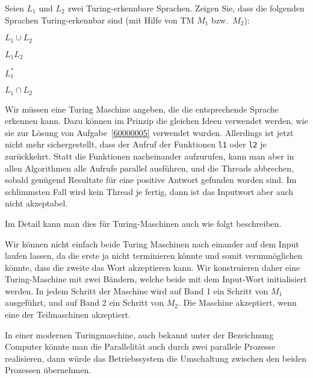 Seien $L_1$ und $L_2$ zwei Turing-erkennbare Sprachen. Zeigen Sie, dass
die folgenden Sprachen Turing-erkennbar sind (mit Hilfe von TM $M_1$
bzw.~$M_2$):
\begin{teilaufgaben}
\item $L_1\cup L_2$
\item $L_1L_2$
\item $L_1^*$
\item $L_1\cap L_2$
\end{teilaufgaben}

\begin{loesung}
Wir müssen eine Turing Maschine angeben, die die entsprechende
Sprache erkennen kann.
Dazu können im Prinzip die gleichen Ideen verwendet werden, wie sie
zur Lösung von Aufgabe~\ref{60000005} verwendet wurden.
Allerdings ist jetzt nicht mehr sichergestellt, dass der Aufruf
der Funktionen \texttt{l1} oder \texttt{l2} je zurückkehrt.
Statt die Funktionen nacheinander aufzurufen, kann man aber in allen
Algorithmen alle Aufrufe parallel ausführen, und die Threads abbrechen,
sobald genügend Resultate für eine positive Antwort gefunden worden
sind. Im schlimmsten Fall wird kein Thread je fertig, dann ist das
Inputwort aber auch nicht akzeptabel.

Im Detail kann man dies für Turing-Maschinen auch wie folgt
beschreiben.
\begin{teilaufgaben}
\item
Wir können nicht einfach beide Turing Maschinen nach einander
auf dem Input laufen lassen, da die erste ja nicht terminieren könnte und
somit verunmöglichen könnte, dass die zweite das Wort akzeptieren kann.
Wir konstruieren daher eine Turing-Maschine mit zwei Bändern, welche
beide mit dem Input-Wort initialisiert werden.
In jedem Schritt der Maschine wird auf Band 1 ein Schritt von $M_1$
ausgeführt, und auf Band 2 ein Schritt von $M_2$.
Die Maschine akzeptiert, wenn eine der Teilmaschinen
akzeptiert.

In einer modernen Turingmaschine, auch bekannt unter der Bezeichnung
Computer könnte man die Parallelität auch durch zwei parallele
Prozesse realisieren, dann würde das Betriebssystem die Umschaltung
zwischen den beiden Prozessen übernehmen.


\end{teilaufgaben}
\end{loesung}
